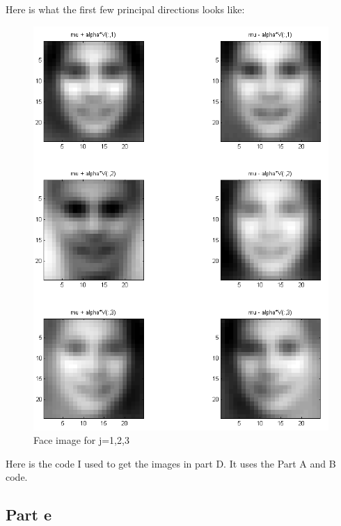 \documentclass[twoside,11pt]{article}
\theoremstyle{definition}
\begin{document}
Here is what the first few principal directions looks like:\\
\begin{figure}[h!]
\centering
\includegraphics[width=5.5 in]{prob3PartD.png}
\caption{Face image for j=1,2,3}
\end{figure}
\newpage
Here is the code I used to get the images in part D. It uses the Part A and B code.\\


\newpage

\subsection*{Part e}
\end{document}
